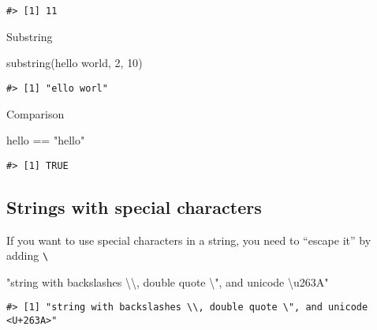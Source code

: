 \documentclass[
]{book}
\newenvironment{Shaded}{\begin{snugshade}}{\end{snugshade}}
\newcommand{\DecValTok}[1]{\textcolor[rgb]{0.00,0.00,0.81}{#1}}
\newcommand{\FunctionTok}[1]{\textcolor[rgb]{0.00,0.00,0.00}{#1}}
\newcommand{\NormalTok}[1]{#1}
\newcommand{\SpecialCharTok}[1]{\textcolor[rgb]{0.00,0.00,0.00}{#1}}
\newcommand{\StringTok}[1]{\textcolor[rgb]{0.31,0.60,0.02}{#1}}
\begin{document}
\begin{verbatim}
#> [1] 11
\end{verbatim}

Substring

\begin{Shaded}
\begin{Highlighting}[]
\FunctionTok{substring}\NormalTok{(}\StringTok{\textquotesingle{}hello world\textquotesingle{}}\NormalTok{, }\DecValTok{2}\NormalTok{, }\DecValTok{10}\NormalTok{)}
\end{Highlighting}
\end{Shaded}

\begin{verbatim}
#> [1] "ello worl"
\end{verbatim}

Comparison

\begin{Shaded}
\begin{Highlighting}[]
\StringTok{\textquotesingle{}hello\textquotesingle{}} \SpecialCharTok{==} \StringTok{"hello"}
\end{Highlighting}
\end{Shaded}

\begin{verbatim}
#> [1] TRUE
\end{verbatim}

\hypertarget{strings-with-special-characters}{%
\subsection{Strings with special characters}\label{strings-with-special-characters}}

If you want to use special characters in a string, you need to ``escape it'' by adding \texttt{\textbackslash{}}

\begin{Shaded}
\begin{Highlighting}[]
\StringTok{"string with backslashes }\SpecialCharTok{\textbackslash{}\textbackslash{}}\StringTok{, double quote }\SpecialCharTok{\textbackslash{}"}\StringTok{, and unicode \textbackslash{}u263A"}
\end{Highlighting}
\end{Shaded}

\begin{verbatim}
#> [1] "string with backslashes \\, double quote \", and unicode <U+263A>"
\end{verbatim}
\end{document}
